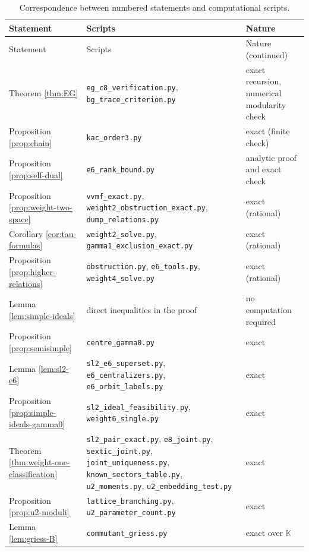 \documentclass[leqno]{article}
\newcommand{\K}{\ensuremath{\mathbb{K}}}
\numberwithin{equation}{section}
\begin{document}
\begingroup
\small
\begin{longtable}{>{\raggedright\arraybackslash}p{3.6cm}>{\raggedright\arraybackslash}p{6.2cm}>{\raggedright\arraybackslash}p{3.3cm}}
\caption{Correspondence between numbered statements and computational scripts.}
\label{tab:scripts-statements}\\
\hline
Statement & Scripts & Nature \\
\hline
\endfirsthead
\hline
Statement & Scripts & Nature (continued) \\
\hline
\endhead
Theorem \ref{thm:EG} & \texttt{eg\_c8\_verification.py}, \texttt{bg\_trace\_criterion.py} & exact recursion, numerical modularity check \\
Proposition \ref{prop:chain} & \texttt{kac\_order3.py} & exact (finite check) \\
Proposition \ref{prop:self-dual} & \texttt{e6\_rank\_bound.py} & analytic proof and exact check \\
Proposition \ref{prop:weight-two-space} & \texttt{vvmf\_exact.py}, \texttt{weight2\_obstruction\_exact.py}, \texttt{dump\_relations.py} & exact (rational) \\
Corollary \ref{cor:tau-formulas} & \texttt{weight2\_solve.py}, \texttt{gamma1\_exclusion\_exact.py} & exact (rational) \\
Proposition \ref{prop:higher-relations} & \texttt{obstruction.py}, \texttt{e6\_tools.py}, \texttt{weight4\_solve.py} & exact (rational) \\
Lemma \ref{lem:simple-ideals} & direct inequalities in the proof & no computation required \\
Proposition \ref{prop:semisimple} & \texttt{centre\_gamma0.py} & exact \\
Lemma \ref{lem:sl2-e6} & \texttt{sl2\_e6\_superset.py}, \texttt{e6\_centralizers.py}, \texttt{e6\_orbit\_labels.py} & exact \\
Proposition \ref{prop:simple-ideals-gamma0} & \texttt{sl2\_ideal\_feasibility.py}, \texttt{weight6\_single.py} & exact \\
Theorem \ref{thm:weight-one-classification} & \texttt{sl2\_pair\_exact.py}, \texttt{e8\_joint.py}, \texttt{sextic\_joint.py}, \texttt{joint\_uniqueness.py}, \texttt{known\_sectors\_table.py}, \texttt{u2\_moments.py}, \texttt{u2\_embedding\_test.py} & exact \\
Proposition \ref{prop:u2-moduli} & \texttt{lattice\_branching.py}, \texttt{u2\_parameter\_count.py} & exact \\
Lemma \ref{lem:griess-B} & \texttt{commutant\_griess.py} & exact over $\K$ \\

\end{longtable}
\end{document}
